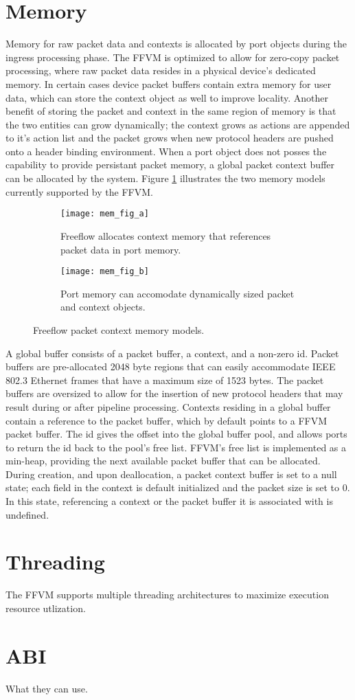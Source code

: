 \section{Memory}
\label{vm:memory}
Memory for raw packet data and contexts is allocated by port objects during the
ingress processing phase. The FFVM is optimized to allow for zero-copy packet
processing, where raw packet data resides in a physical device's dedicated
memory. In certain cases device packet buffers contain extra memory for user
data, which can store the context object as well to improve locality. Another
benefit of storing the packet and context in the same region of memory is that
the two entities can grow dynamically; the context grows as actions are appended
to it's action list and the packet grows when new protocol headers are pushed
onto a header binding environment. When a port object does not posses the
capability to provide persistant packet memory, a global packet context buffer
can be allocated by the system. Figure \ref{mem_model} illustrates the two
memory models currently supported by the FFVM.

\begin{figure}[h]
  \centering
  \begin{subfigure}[b]{0.48\textwidth}
    \centering
    \texttt{[image: mem\_fig\_a]}
    \caption{Freeflow allocates context memory that references packet data
    in port memory.}
  \end{subfigure}
  \hfill
  \begin{subfigure}[b]{0.48\textwidth}
    \centering
    \texttt{[image: mem\_fig\_b]}
    \caption{Port memory can accomodate dynamically sized packet and context
    objects.}
  \end{subfigure}
  \caption{Freeflow packet context memory models.}
  \label{mem_model}
\end{figure}

A global buffer consists of a packet buffer, a context, and a non-zero
id. Packet buffers are pre-allocated 2048 byte regions that can easily
accommodate IEEE 802.3 Ethernet frames that have a maximum size of 1523 bytes.
The packet buffers are oversized to allow for the insertion of new protocol
headers that may result during or after pipeline processing. Contexts residing
in a global buffer contain a reference to the packet buffer, which by default
points to a FFVM packet buffer. The id gives the offset into the global buffer
pool, and allows ports to return the id back to the pool's free list. FFVM's
free list is implemented as a min-heap, providing the next available packet
buffer that can be allocated. During creation, and upon deallocation, a packet
context buffer is set to a null state; each field in the context is default
initialized and the packet size is set to 0. In this state, referencing a
context or the packet buffer it is associated with is undefined.

\section{Threading}
\label{vm:threading}
The FFVM supports multiple threading architectures to maximize execution
resource utlization.


\section{ABI}
\label{vm:abi}
What they can use.
